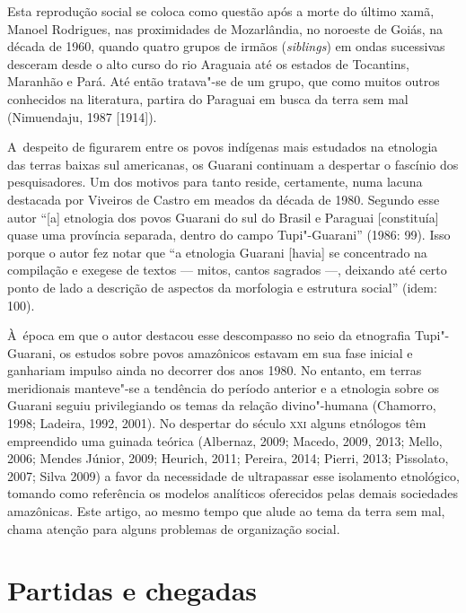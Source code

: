 Esta reprodução social se coloca como questão após a morte do último
xamã, Manoel Rodrigues, nas proximidades de Mozarlândia, no noroeste de
Goiás, na década de 1960, quando quatro grupos de irmãos (\emph{siblings}) em
ondas sucessivas desceram desde o alto curso do rio Araguaia até os
estados de Tocantins, Maranhão e Pará. Até então tratava"-se de um
grupo, que como muitos outros conhecidos na literatura, partira do
Paraguai em busca da terra sem mal (Nimuendaju, 1987 [1914]).

A~despeito de figurarem entre os povos indígenas mais estudados na
etnologia das terras baixas sul americanas, os Guarani continuam a
despertar o fascínio dos pesquisadores. Um dos motivos para tanto
reside, certamente, numa lacuna destacada por Viveiros de Castro em
meados da década de 1980. Segundo esse autor ``[a] etnologia dos povos
Guarani do sul do Brasil e Paraguai [constituía] quase uma província
separada, dentro do campo Tupi"-Guarani'' (1986: 99). Isso porque o autor
fez notar que ``a etnologia Guarani [havia] se concentrado na compilação
e exegese de textos --- mitos, cantos sagrados ---, deixando até certo
ponto de lado a descrição de aspectos da morfologia e estrutura social''
(idem: 100).

À~época em que o autor destacou esse descompasso no seio da etnografia
Tupi"-Guarani, os estudos sobre povos amazônicos estavam em sua fase
inicial e ganhariam impulso ainda no decorrer dos anos 1980. No
entanto, em terras meridionais manteve"-se a tendência do período
anterior e a etnologia sobre os Guarani seguiu privilegiando os temas
da relação divino"-humana (Chamorro, 1998; Ladeira, 1992, 2001). No
despertar do século \textsc{xxi} alguns etnólogos têm empreendido uma guinada
teórica (Albernaz, 2009; Macedo, 2009, 2013; Mello, 2006; Mendes
Júnior, 2009; Heurich, 2011; Pereira, 2014; Pierri, 2013; Pissolato,
2007; Silva 2009) a favor da necessidade de ultrapassar esse isolamento
etnológico, tomando como referência os modelos analíticos oferecidos
pelas demais sociedades amazônicas. Este artigo, ao mesmo tempo que
alude ao tema da terra sem mal, chama atenção para alguns problemas de
organização social. 

\section{Partidas e chegadas}

